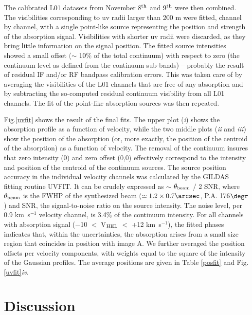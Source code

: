 \documentclass[oldversion]{aa}
\begin{document}
The calibrated L01 datasets from November 8$^{\rm th}$ and 9$^{\rm th}$ were then combined.
The visibilities corresponding to uv radii larger than 200 m were fitted, channel by
channel, with a single point-like source representing the position and strength of the
absorption signal. Visibilities with shorter uv radii were discarded, as they bring little
information on the signal position. The fitted source intensities showed a small offset
($\sim$ 10\% of the total continuum)
with respect to zero (the continuum level as defined from the continuum sub-bands) --
probably the result of residual IF and/or RF bandpass calibration errors. This was taken care
of by averaging the visibilities of the L01 channels that are free of any absorption and by
subtracting the so-computed residual continuum visibility from all L01 channels.
The fit of the point-like absorption sources was then repeated.




Fig.\ref{uvfit} shows the result of the final fits. The upper plot ({\em i}) shows the
absorption profile as a function of velocity, while the two middle plots ({\em ii} and
{\em iii}) show the position of the absorption (or, more exactly, the position of the
centroid of the absorption) as a function of velocity. The removal of the continuum insures
that zero intensity (0) and zero offset (0,0) effectively correspond to the intensity and
position of the centroid of the continuum sources. The source position accuracy in the
individual velocity channels was calculated by the GILDAS fitting routine UVFIT. It can be
crudely expressed as $\sim$ $\theta _{\rm beam}$ / 2 SNR, where $\theta _{\rm beam}$ is
the FWHP of the synthesized beam ($\simeq 1.2 \times 0.7\arcsec$, P.A. 176$\degr$)
and SNR, the signal-to-noise ratio
on the source intensity. The noise level, per 0.9 km~s$^{-1}$ velocity channel, is 3.4\% of
the continuum intensity.
For all channels with absorption signal ($-$10 $<$ V$_{\rm HEL}$ $<$ +12 km~s$^{-1}$), the
fitted phases indicates that, within the uncertainties, the absorption arises from a small
size region that coincides in position with image A. We further averaged the position
offsets per velocity components, with weights equal to the square of
the intensity of the Gaussian profiles.
The average positions are given in Table \ref{posfit} and Fig.\ref{uvfit}{\em iv}.





\section{Discussion}
\end{document}

